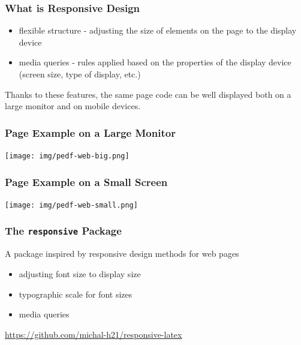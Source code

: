 \begin{frame}
   \frametitle{What is Responsive Design}
   \begin{itemize}
     \item flexible structure - adjusting the size of elements on the page to the display device
     \item media queries - rules applied based on the properties of the display device (screen size, type of display, etc.)
   \end{itemize}

   Thanks to these features, the same page code can be well displayed both on a large monitor and on mobile devices.
\end{frame}

\begin{frame}
  \frametitle{Page Example on a Large Monitor}
  \begin{center}
    \texttt{[image: img/pedf-web-big.png]}
  \end{center}
\end{frame}

\begin{frame}
  \frametitle{Page Example on a Small Screen}
  \begin{center}
    \texttt{[image: img/pedf-web-small.png]}
  \end{center}
\end{frame}

\begin{frame}
  \frametitle{The \texttt{responsive} Package}

  A package inspired by responsive design methods for web pages
  \begin{itemize}
  \item adjusting font size to display size
  \item typographic scale for font sizes
  \item media queries
  \end{itemize}
  \url{https://github.com/michal-h21/responsive-latex}
\end{frame}

